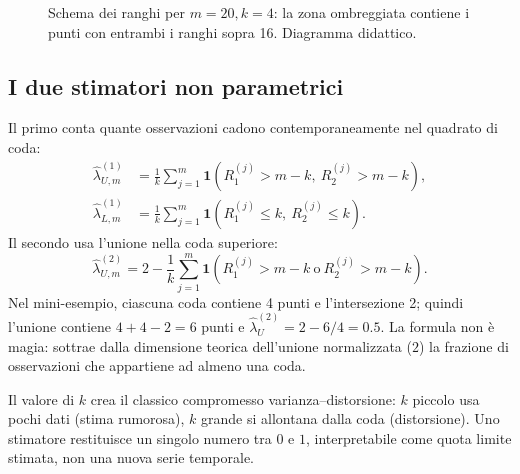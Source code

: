 \documentclass[11pt,a4paper]{article}
\newcommand{\ind}{\mathbf{1}}
\begin{document}
\begin{figure}[ht]
\centering
{}
\caption{Schema dei ranghi per $m=20,k=4$: la zona ombreggiata contiene i punti con entrambi i ranghi sopra 16. Diagramma didattico.}
\label{fig:ranks}
\end{figure}

\subsection{I due stimatori non parametrici}
Il primo conta quante osservazioni cadono contemporaneamente nel quadrato di
coda:
\begin{align}
 \widehat\lambda_{U,m}^{(1)}
   &=\frac1k\sum_{j=1}^m
     \ind\!\left(R_1^{(j)}>m-k,\ R_2^{(j)}>m-k\right),\\
 \widehat\lambda_{L,m}^{(1)}
   &=\frac1k\sum_{j=1}^m
     \ind\!\left(R_1^{(j)}\leq k,\ R_2^{(j)}\leq k\right).
 \label{eq:np1}
\end{align}
Il secondo usa l'unione nella coda superiore:
\begin{equation}
 \widehat\lambda_{U,m}^{(2)}
 =2-\frac1k\sum_{j=1}^m
   \ind\!\left(R_1^{(j)}>m-k\ \text{o}\ R_2^{(j)}>m-k\right).
 \label{eq:np2}
\end{equation}
Nel mini-esempio, ciascuna coda contiene 4 punti e l'intersezione 2; quindi
l'unione contiene $4+4-2=6$ punti e
$\widehat\lambda_U^{(2)}=2-6/4=0.5$. La formula non è magia: sottrae dalla
dimensione teorica dell'unione normalizzata ($2$) la frazione di osservazioni
che appartiene ad almeno una coda.

Il valore di $k$ crea il classico compromesso varianza--distorsione: $k$
piccolo usa pochi dati (stima rumorosa), $k$ grande si allontana dalla coda
(distorsione). Uno stimatore restituisce un singolo numero tra $0$ e $1$,
interpretabile come quota limite stimata, non una nuova serie temporale.
\end{document}
